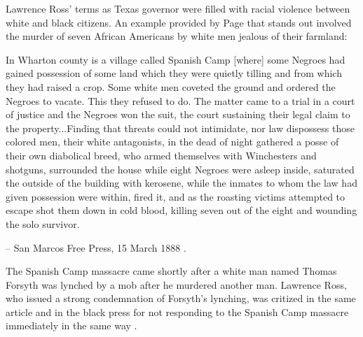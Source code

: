 \documentclass[12pt]{article}
\begin{document}
Lawrence Ross' terms as Texas governor were filled with racial violence between white and black citizens. An example provided by Page that stands out involved the murder of seven African Americans by white men jealous of their farmland:
\begin{displayquote}
In Wharton county is a village called Spanish Camp [where] some Negroes had gained possession of some land which they were quietly tilling and from which they had raised a crop. Some white men coveted the ground and ordered the Negroes to vacate.  This they refused to do. The matter came to a trial in a court of justice and the Negroes won the suit, the court sustaining their legal claim to the property...Finding that threats could not intimidate, nor law dispossess those colored men, their white antagonists, in the dead of night gathered a posse of their own diabolical breed, who armed themselves with Winchesters and shotguns, surrounded the house while eight Negroes were asleep inside, saturated the outside of the building with kerosene, while the inmates to whom the law had given possession were within, fired it, and as the roasting victims attempted to escape shot them down in cold blood, killing seven out of the eight and wounding the solo survivor.

-- San Marcos Free Press, 15 March 1888 \cite{sanmarcospress}.
\end{displayquote}

The Spanish Camp massacre came shortly after a white man named Thomas Forsyth was lynched by a mob after he murdered another man. Lawrence Ross, who issued a strong condemnation of Forsyth's lynching, was critized in the same article and in the black press for not responding to the Spanish Camp massacre immediately in the same way \cite[pg. 97--98]{page}. 
\end{document}
